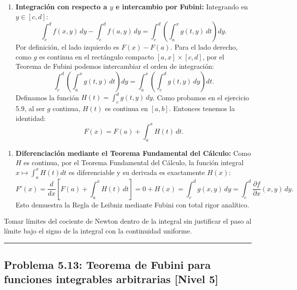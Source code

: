 \documentclass[11pt,a4paper]{article}
\begin{document}
\begin{enumerate}[label=\textbf{\arabic*.}]
\item \textbf{Integración con respecto a $y$ e intercambio por Fubini:}
Integrando en $y \in [c, d]$:
\begin{equation*}
\int_c^d f(x, y) \, dy - \int_c^d f(a, y) \, dy = \int_c^d \left( \int_a^x g(t, y) \, dt \right) dy.
\end{equation*}
Por definición, el lado izquierdo es $F(x) - F(a)$.
Para el lado derecho, como $g$ es continua en el rectángulo compacto $[a,x] \times [c,d]$, por el Teorema de Fubini podemos intercambiar el orden de integración:
\begin{equation*}
\int_c^d \left( \int_a^x g(t, y) \, dt \right) dy = \int_a^x \left( \int_c^d g(t, y) \, dy \right) dt.
\end{equation*}
Definamos la función $H(t) = \int_c^d g(t, y) \, dy$.
Como probamos en el ejercicio 5.9, al ser $g$ continua, $H(t)$ es continua en $[a,b]$.
Entonces tenemos la identidad:
\begin{equation*}
F(x) = F(a) + \int_a^x H(t) \, dt.
\end{equation*}
\end{enumerate}

\begin{enumerate}[label=\textbf{\arabic*.}]
\item \textbf{Diferenciación mediante el Teorema Fundamental del Cálculo:}
Como $H$ es continua, por el Teorema Fundamental del Cálculo, la función integral $x \mapsto \int_a^x H(t) dt$ es diferenciable y su derivada es exactamente $H(x)$:
\begin{equation*}
F'(x) = \frac{d}{dx}\left[ F(a) + \int_a^x H(t) \, dt \right] = 0 + H(x) = \int_c^d g(x, y) \, dy = \int_c^d \frac{\partial f}{\partial x}(x,y) \, dy.
\end{equation*}
Esto demuestra la Regla de Leibniz mediante Fubini con total rigor analítico.
\end{enumerate}

\begin{trapbox}
Tomar límites del cociente de Newton dentro de la integral sin justificar el paso al límite bajo el signo de la integral con la continuidad uniforme.
\end{trapbox}

\vspace{0.5cm}
\hrule
\vspace{0.5cm}

\subsection*{Problema 5.13: Teorema de Fubini para funciones integrables arbitrarias \hfill \color{primaryblue}\small[Nivel 5]}
\end{document}
